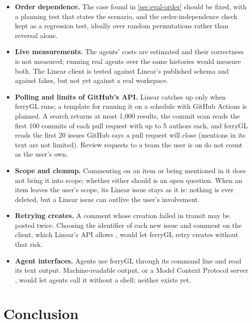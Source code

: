 \documentclass[11pt,a4paper]{article}
\newcommand{\ferry}{ferryGL}
\begin{document}
\begin{itemize}
  \item \textbf{Order dependence.} The case found in \cref{sec:eval-order} should be fixed, with
    a planning test that states the scenario, and the order-independence check kept as a
    regression test, ideally over random permutations rather than reversal alone.
  \item \textbf{Live measurements.} The agents' costs are estimated and their correctness is not
    measured; running real agents over the same histories would measure both. The Linear client
    is tested against Linear's published schema and against fakes, but not yet against a real
    workspace.
  \item \textbf{Polling and limits of GitHub's API.} Linear catches up only when \ferry{} runs; a
    template for running it on a schedule with GitHub Actions is planned. A search returns at
    most 1,000 results, the commit scan reads the first 100 commits of each pull request with up
    to 5 authors each, and \ferry{} reads the first 20 issues GitHub says a pull request will
    close (mentions in its text are not limited). Review requests to a team the user is on do
    not count as the user's own.
  \item \textbf{Scope and cleanup.} Commenting on an item or being mentioned in it does not bring
    it into scope; whether either should is an open question. When an item leaves the user's
    scope, its Linear issue stays as it is: nothing is ever deleted, but a Linear issue can
    outlive the user's involvement.
  \item \textbf{Retrying creates.} A comment whose creation failed in transit may be posted
    twice. Choosing the identifier of each new issue and comment on the client, which Linear's
    API allows \cite{linear2026schema}, would let \ferry{} retry creates without that risk.
  \item \textbf{Agent interfaces.} Agents use \ferry{} through its command line and read its
    text output. Machine-readable output, or a Model Context Protocol server
    \cite{anthropic2024mcp}, would let agents call it without a shell; neither exists yet.
\end{itemize}

\section{Conclusion}
\label{sec:conclusion}
\end{document}
